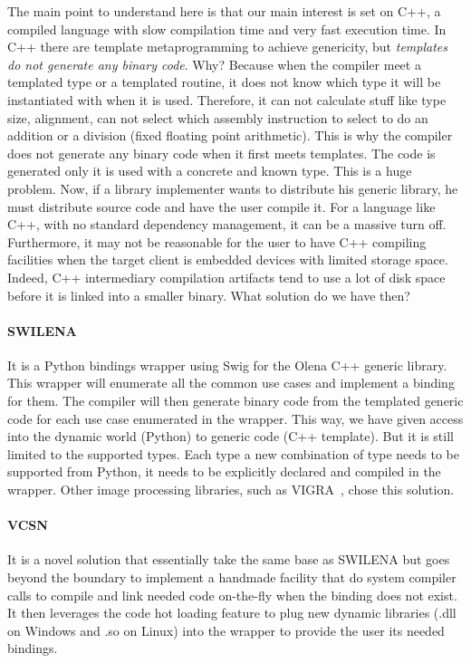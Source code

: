 The main point to understand here is that our main interest is set on C++, a compiled language with slow compilation
time and very fast execution time. In C++ there are template metaprogramming to achieve genericity, but \emph{templates
  do not generate any binary code}. Why? Because when the compiler meet a templated type or a templated routine, it does
not know which type it will be instantiated with when it is used. Therefore, it can not calculate stuff like type size,
alignment, can not select which assembly instruction to select to do an addition or a division (fixed \vs floating
point arithmetic). This is why the compiler does not generate any binary code when it first meets templates. The code is
generated only it is used with a concrete and known type. This is a huge problem. Now, if a library implementer wants to
distribute his generic library, he must distribute source code and have  the user compile it. For a language like C++,
with no standard dependency management, it can be a massive turn off. Furthermore, it may not be reasonable for the user
to have C++ compiling facilities when the target client is embedded devices with limited storage space. Indeed, C++
intermediary compilation artifacts tend to use a lot of disk space before it is linked into a smaller binary. What
solution do we have then?

\paragraph{SWILENA~\parencite{beazley.1996.swig,olena.2000.www}} It is a Python bindings wrapper using Swig for the
Olena C++ generic library. This wrapper will enumerate all the common use cases and implement a binding for them. The
compiler will then generate binary code from the templated generic code for each use case enumerated in the wrapper.
This way, we have given access into the dynamic world (Python) to generic code (C++ template). But it is still limited
to the supported types. Each type a new combination of type needs to be supported from Python, it needs to be explicitly
declared and compiled in the wrapper. Other image processing libraries, such as VIGRA~\parencite{kothe.2011.generic},
chose this solution.

\paragraph{VCSN~\parencite{demaille.2013.vcsn}} It is a novel solution that essentially take the same base as SWILENA
but goes beyond the boundary to implement a handmade facility that do system compiler calls to compile and link needed
code on-the-fly when the binding does not exist. It then leverages the code hot loading feature to plug new dynamic
libraries (.dll on Windows and .so on Linux) into the wrapper to provide the user its needed bindings.

